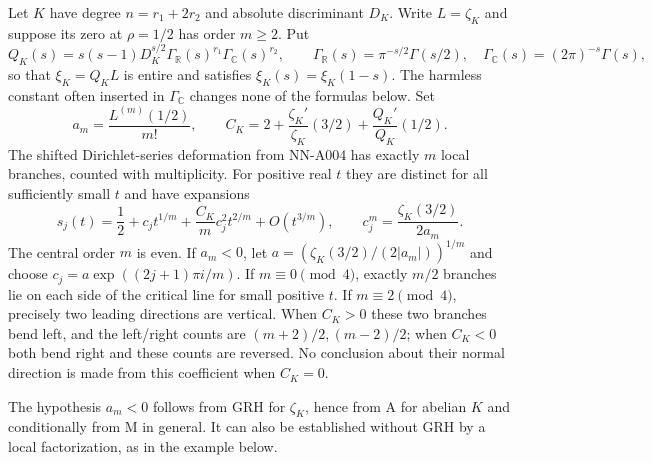 \begin{theorem}
Let $K$ have degree $n=r_1+2r_2$ and absolute discriminant $D_K$.
Write $L=\zeta_K$ and suppose its zero at $\rho=1/2$ has order
$m\ge2$. Put
\[
 Q_K(s)=s(s-1)D_K^{s/2}\Gamma_{\mathbb R}(s)^{r_1}
           \Gamma_{\mathbb C}(s)^{r_2},\qquad
 \Gamma_{\mathbb R}(s)=\pi^{-s/2}\Gamma(s/2),\quad
 \Gamma_{\mathbb C}(s)=(2\pi)^{-s}\Gamma(s),
\]
so that $\xi_K=Q_KL$ is entire and satisfies
$\xi_K(s)=\xi_K(1-s)$. The harmless constant often inserted in
$\Gamma_{\mathbb C}$ changes none of the formulas below. Set
\[
 a_m=\frac{L^{(m)}(1/2)}{m!},\qquad
 C_K=2+\frac{\zeta_K'}{\zeta_K}(3/2)
                 +\frac{Q_K'}{Q_K}(1/2).
\]
The shifted Dirichlet-series deformation from NN-A004 has exactly $m$
local branches, counted with multiplicity. For positive real $t$ they
are distinct for all sufficiently small $t$ and have expansions
\begin{equation}\label{eq:central-second-jet}
 s_j(t)=\frac12+c_jt^{1/m}
              +\frac{C_K}{m}c_j^2t^{2/m}+O(t^{3/m}),\qquad
 c_j^m=\frac{\zeta_K(3/2)}{2a_m}.
\end{equation}
The central order $m$ is even. If $a_m<0$, let
$a=(\zeta_K(3/2)/(2|a_m|))^{1/m}$ and choose
$c_j=a\exp((2j+1)\pi i/m)$. If $m\equiv0\pmod4$, exactly $m/2$
branches lie on each side of the critical line for small positive $t$.
If $m\equiv2\pmod4$, precisely two leading directions are vertical.
When $C_K>0$ these two branches bend left, and the left/right counts
are $(m+2)/2,(m-2)/2$; when $C_K<0$ both bend right and these counts
are reversed. No conclusion about their normal direction is made
from this coefficient when $C_K=0$.

The hypothesis $a_m<0$ follows from GRH for $\zeta_K$, hence from A
for abelian $K$ and conditionally from M in general. It can also be
established without GRH by a local factorization, as in the example
below.
\end{theorem}

